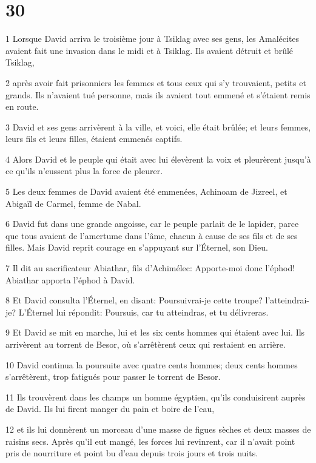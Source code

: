 \chapter{30}

\par 1 Lorsque David arriva le troisième jour à Tsiklag avec ses gens, les Amalécites avaient fait une invasion dans le midi et à Tsiklag. Ils avaient détruit et brûlé Tsiklag,
\par 2 après avoir fait prisonniers les femmes et tous ceux qui s'y trouvaient, petits et grands. Ils n'avaient tué personne, mais ils avaient tout emmené et s'étaient remis en route.
\par 3 David et ses gens arrivèrent à la ville, et voici, elle était brûlée; et leurs femmes, leurs fils et leurs filles, étaient emmenés captifs.
\par 4 Alors David et le peuple qui était avec lui élevèrent la voix et pleurèrent jusqu'à ce qu'ils n'eussent plus la force de pleurer.
\par 5 Les deux femmes de David avaient été emmenées, Achinoam de Jizreel, et Abigaïl de Carmel, femme de Nabal.
\par 6 David fut dans une grande angoisse, car le peuple parlait de le lapider, parce que tous avaient de l'amertume dans l'âme, chacun à cause de ses fils et de ses filles. Mais David reprit courage en s'appuyant sur l'Éternel, son Dieu.
\par 7 Il dit au sacrificateur Abiathar, fils d'Achimélec: Apporte-moi donc l'éphod! Abiathar apporta l'éphod à David.
\par 8 Et David consulta l'Éternel, en disant: Poursuivrai-je cette troupe? l'atteindrai-je? L'Éternel lui répondit: Poursuis, car tu atteindras, et tu délivreras.
\par 9 Et David se mit en marche, lui et les six cents hommes qui étaient avec lui. Ils arrivèrent au torrent de Besor, où s'arrêtèrent ceux qui restaient en arrière.
\par 10 David continua la poursuite avec quatre cents hommes; deux cents hommes s'arrêtèrent, trop fatigués pour passer le torrent de Besor.
\par 11 Ils trouvèrent dans les champs un homme égyptien, qu'ils conduisirent auprès de David. Ils lui firent manger du pain et boire de l'eau,
\par 12 et ils lui donnèrent un morceau d'une masse de figues sèches et deux masses de raisins secs. Après qu'il eut mangé, les forces lui revinrent, car il n'avait point pris de nourriture et point bu d'eau depuis trois jours et trois nuits.
